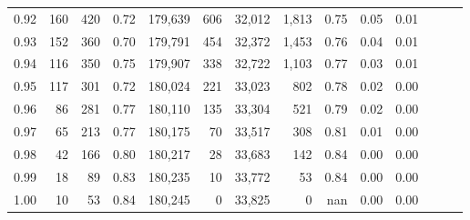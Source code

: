 \begin{tabular}{rrrrrrrrrrrrrr}
0.92 &    160 &  420 &  0.72 &  179,639 &      606 &  32,012 &   1,813 &  0.75 &  0.05 &      0.01 \\
0.93 &    152 &  360 &  0.70 &  179,791 &      454 &  32,372 &   1,453 &  0.76 &  0.04 &      0.01 \\
0.94 &    116 &  350 &  0.75 &  179,907 &      338 &  32,722 &   1,103 &  0.77 &  0.03 &      0.01 \\
0.95 &    117 &  301 &  0.72 &  180,024 &      221 &  33,023 &     802 &  0.78 &  0.02 &      0.00 \\
0.96 &     86 &  281 &  0.77 &  180,110 &      135 &  33,304 &     521 &  0.79 &  0.02 &      0.00 \\
0.97 &     65 &  213 &  0.77 &  180,175 &       70 &  33,517 &     308 &  0.81 &  0.01 &      0.00 \\
0.98 &     42 &  166 &  0.80 &  180,217 &       28 &  33,683 &     142 &  0.84 &  0.00 &      0.00 \\
0.99 &     18 &   89 &  0.83 &  180,235 &       10 &  33,772 &      53 &  0.84 &  0.00 &      0.00 \\
1.00 &     10 &   53 &  0.84 &  180,245 &        0 &  33,825 &       0 &   nan &  0.00 &      0.00 \\
\bottomrule
\end{tabular}
